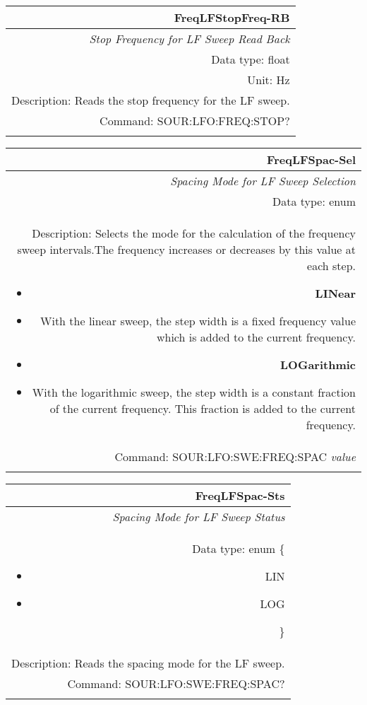 \documentclass[openany]{article}
\begin{document}
		\begin{tabular}{N}
			\hline
			\bfseries FreqLFStopFreq-RB \\ \hline
			\emph{Stop Frequency for LF Sweep Read Back} \\
			Data type: float \\
			Unit: Hz \\
			Description: Reads the stop frequency for the LF sweep. \\
			Command: SOUR:LFO:FREQ:STOP? \\
			\\

		\end{tabular}


		\begin{tabular}{N}
			\hline
			\bfseries FreqLFSpac-Sel \\ \hline
			\emph{Spacing Mode for LF Sweep Selection} \\
			Data type: enum \\ 
			Description: Selects the mode for the calculation of the frequency sweep intervals.The frequency increases or decreases by this value at each step.\begin{itemize}[noitemsep]
				\small
				\item[] \textbf{LINear} 
				\item[] With the linear sweep, the step width is a fixed frequency value which is added to the current frequency.
				\item[] \textbf{LOGarithmic}
				\item[] With the logarithmic sweep, the step width is a constant fraction of the current frequency. This fraction is added to the current frequency.
			\end{itemize} \\
			Command: SOUR:LFO:SWE:FREQ:SPAC \emph{value} \\
			\\

		\end{tabular}


		\begin{tabular}{N}
			\hline
			\bfseries FreqLFSpac-Sts \\ \hline
			\emph{Spacing Mode for LF Sweep Status} \\
			Data type: enum \{\begin{itemize}[noitemsep]
				\small
				\item[] LIN
				\item[] LOG
			\end{itemize}\} \\ 
			Description: Reads the spacing mode for the LF sweep. \\
			Command: SOUR:LFO:SWE:FREQ:SPAC? \\
			\\

		\end{tabular}
\end{document}
